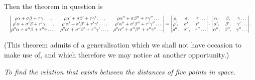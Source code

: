 \documentclass[11pt]{article}
\begin{document}
Then the theorem in question is
\[
\resizebox{\textwidth}{!}{$\displaystyle
\begin{vmatrix}
\rho\alpha + \sigma\beta + \tau\gamma \dots, & \rho\alpha' + \sigma\beta' + \tau\gamma' \dots, & \rho\alpha'' + \sigma\beta'' + \tau\gamma'' \dots \\
\rho'\alpha + \sigma'\beta + \tau'\gamma \dots, & \rho'\alpha' + \sigma'\beta' + \tau'\gamma' \dots, & \rho'\alpha'' + \sigma'\beta'' + \tau'\gamma'' \dots \\
\rho''\alpha + \sigma''\beta + \tau''\gamma \dots, & \rho''\alpha' + \sigma''\beta' + \tau''\gamma' \dots, & \rho''\alpha'' + \sigma''\beta'' + \tau''\gamma'' \dots
\end{vmatrix}
=
\begin{vmatrix} \rho, & \sigma, & \tau \dots \\ \rho', & \sigma', & \tau' \dots \\ \rho'', & \sigma'', & \tau'' \dots \end{vmatrix}
\cdot
\begin{vmatrix} \alpha, & \beta, & \gamma \dots \\ \alpha', & \beta', & \gamma' \dots \\ \alpha'', & \beta'', & \gamma'' \dots \end{vmatrix}.
$}
\]

(This theorem admits of a generalisation which we shall not have occasion to make use of, and which therefore we may notice at another opportunity.)

\medskip

\noindent\textit{To find the relation that exists between the distances of five points in space.}

\medskip
\end{document}
